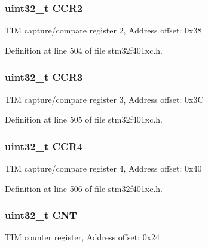 \subsubsection[{\texorpdfstring{C\+C\+R2}{CCR2}}]{ uint32\+\_\+t C\+C\+R2}\hypertarget{struct_t_i_m___type_def_ab90aa584f07eeeac364a67f5e05faa93}{}\label{struct_t_i_m___type_def_ab90aa584f07eeeac364a67f5e05faa93}
T\+IM capture/compare register 2, Address offset\+: 0x38 

Definition at line 504 of file stm32f401xc.\+h.

\subsubsection[{\texorpdfstring{C\+C\+R3}{CCR3}}]{ uint32\+\_\+t C\+C\+R3}\hypertarget{struct_t_i_m___type_def_a27a478cc47a3dff478555ccb985b06a2}{}\label{struct_t_i_m___type_def_a27a478cc47a3dff478555ccb985b06a2}
T\+IM capture/compare register 3, Address offset\+: 0x3C 

Definition at line 505 of file stm32f401xc.\+h.

\subsubsection[{\texorpdfstring{C\+C\+R4}{CCR4}}]{ uint32\+\_\+t C\+C\+R4}\hypertarget{struct_t_i_m___type_def_a85fdb75569bd7ea26fa48544786535be}{}\label{struct_t_i_m___type_def_a85fdb75569bd7ea26fa48544786535be}
T\+IM capture/compare register 4, Address offset\+: 0x40 

Definition at line 506 of file stm32f401xc.\+h.

\subsubsection[{\texorpdfstring{C\+NT}{CNT}}]{ uint32\+\_\+t C\+NT}\hypertarget{struct_t_i_m___type_def_a6095a27d764d06750fc0d642e08f8b2a}{}\label{struct_t_i_m___type_def_a6095a27d764d06750fc0d642e08f8b2a}
T\+IM counter register, Address offset\+: 0x24 

